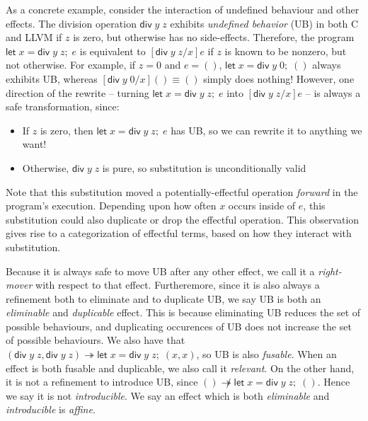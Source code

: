 \documentclass[acmsmall,screen,review]{acmart}
\newcommand{\ms}[1]{\ensuremath{\mathsf{#1}}}
\newcommand{\letexpr}[3]{\ensuremath{\ms{let}\;#1 = #2;\;#3}}
\newcommand{\tref}{\twoheadrightarrow}
\begin{document}
As a concrete example, consider the interaction of undefined behaviour and other effects.
The division operation $\ms{div}\;y\;z$ exhibits \emph{undefined behavior} (UB) in both C and
LLVM if $z$ is zero, but otherwise has no side-effects. Therefore, the program 
$\letexpr{x}{\ms{div}\;y\;z}{e}$ is equivalent to $[\ms{div}\;y\;z/x]e$ if $z$ is known
to be nonzero, but not otherwise. For example, if $z = 0$ and $e = ()$,
$\letexpr{x}{\ms{div}\;y\;0}{()}$ always exhibits UB, whereas $[\ms{div}\;y\;0/x]() \equiv ()$ simply
does nothing! However, one direction of the rewrite -- turning $\letexpr{x}{\ms{div}\;y\;z}{e}$ into
$[\ms{div}\;y\;z/x]e$ -- is always a safe transformation, since:
\begin{itemize}
  \item If $z$ is zero, then $\letexpr{x}{\ms{div}\;y\;z}{e}$ has UB, so we can rewrite it to
  anything we want!
  \item Otherwise, $\ms{div}\;y\;z$ is pure, so substitution is unconditionally valid
\end{itemize}
%
% 
% 
Note that this substitution moved a potentially-effectful operation \emph{forward} in the program's
execution. Depending upon how often $x$ occurs inside of $e$, this substitution could also duplicate
or drop the effectful operation. This observation gives rise to a categorization of effectful terms,
based on how they interact with substitution. 

Because it is always safe to move UB after any other effect, we call it a \emph{right-mover} with
respect to that effect. Furtheremore, since it is also always a refinement both to eliminate and to
duplicate UB, we say UB is both an \emph{eliminable} and \emph{duplicable} effect. This is because
eliminating UB reduces the set of possible behaviours, and duplicating occurences of UB does not
increase the set of possible behaviours. We also have that $(\ms{div}\;y\;z, \ms{div}\;y\;z) \tref
\letexpr{x}{\ms{div}\;y\;z}{(x, x)}$, so UB is also \emph{fusable}. When an effect is both fusable
and duplicable, we also call it \emph{relevant}.  On the other hand, it is not a refinement to
introduce UB, since $() \not\tref \letexpr{x}{\ms{div}\;y\;z}{()}$. Hence we say it is not
\emph{introducible}. We say an effect which is both \emph{eliminable} and \emph{introducible} is
\emph{affine}. 
\end{document}
